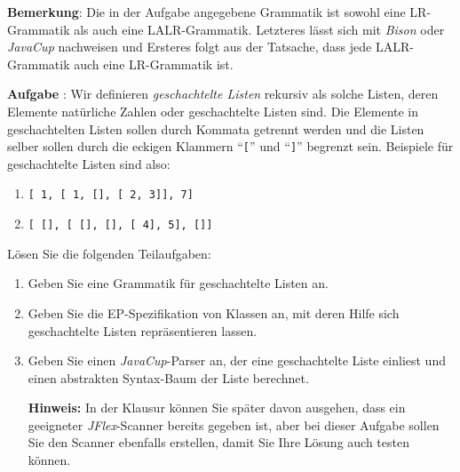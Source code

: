 \documentclass{article}
\newcounter{aufgabe}
\newcommand{\exercise}{\vspace*{0.1cm}

\stepcounter{aufgabe}
\vspace*{0.3cm}

\noindent
\textbf{Aufgabe \arabic{aufgabe}}: }
\begin{document}
\begin{enumerate}
      \noindent
      \textbf{Bemerkung}:  Die in der Aufgabe angegebene Grammatik ist sowohl eine LR-Grammatik als
      auch eine LALR-Grammatik.  Letzteres l\"asst sich mit \textsl{Bison} oder \textsl{JavaCup} nachweisen 
      und Ersteres folgt aus der Tatsache, dass jede LALR-Grammatik auch eine LR-Grammatik ist.
\end{enumerate}
\pagebreak

\exercise
Wir definieren \emph{geschachtelte Listen} rekursiv als solche Listen, 
deren Elemente nat\"urliche Zahlen oder geschachtelte Listen sind.  Die Elemente in
geschachtelten Listen sollen durch Kommata getrennt werden und die Listen selber sollen
durch die eckigen Klammern ``\texttt{[}'' und ``\texttt{]}'' begrenzt sein.
Beispiele f\"ur geschachtelte Listen sind also:
\begin{enumerate}
\item \texttt{[ 1, [ 1, [], [ 2, 3]], 7]}
\item \texttt{[ [], [ [], [], [ 4], 5], []]}
\end{enumerate}
L\"osen Sie die folgenden Teilaufgaben:
\begin{enumerate}
\item Geben Sie eine Grammatik f\"ur geschachtelte Listen an.
\item Geben Sie die EP-Spezifikation von Klassen an, mit deren Hilfe sich
      geschachtelte Listen repr\"asentieren lassen.
\item Geben Sie einen \textsl{JavaCup}-Parser an, der eine geschachtelte Liste einliest
      und einen abstrakten Syntax-Baum der Liste berechnet.

      \textbf{Hinweis:} In der Klausur k\"onnen Sie sp\"ater davon ausgehen, dass ein geeigneter
      \textsl{JFlex}-Scanner bereits gegeben ist, aber bei dieser Aufgabe sollen Sie den
      Scanner ebenfalls erstellen, damit Sie Ihre L\"osung auch testen k\"onnen.
\end{enumerate}
\end{document}
